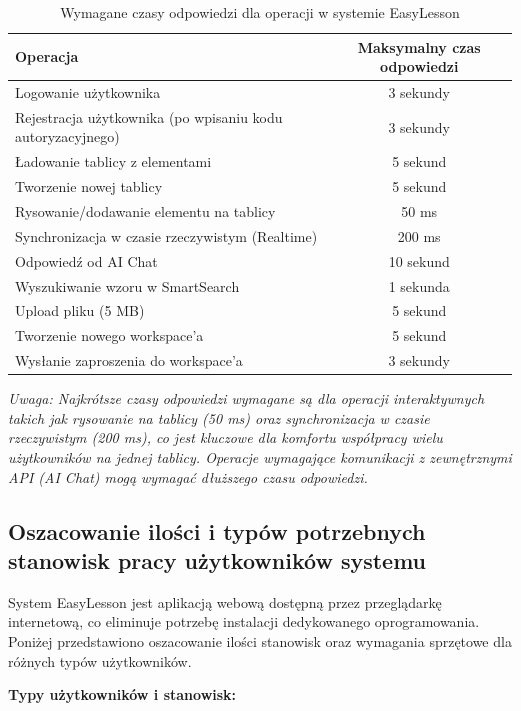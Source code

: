 \documentclass[12pt,a4paper]{article}
\begin{document}
\begin{table}[H]
\centering
\begin{tabular}{|l|c|}
\hline
\textbf{Operacja} & \textbf{Maksymalny czas odpowiedzi} \\ \hline
Logowanie użytkownika & 3 sekundy \\ \hline
Rejestracja użytkownika (po wpisaniu kodu autoryzacyjnego) & 3 sekundy \\ \hline
Ładowanie tablicy z elementami & 5 sekund \\ \hline
Tworzenie nowej tablicy & 5 sekund \\ \hline
Rysowanie/dodawanie elementu na tablicy & 50 ms \\ \hline
Synchronizacja w czasie rzeczywistym (Realtime) & 200 ms \\ \hline
Odpowiedź od AI Chat & 10 sekund \\ \hline
Wyszukiwanie wzoru w SmartSearch & 1 sekunda \\ \hline
Upload pliku (5 MB) & 5 sekund \\ \hline
Tworzenie nowego workspace'a & 5 sekund \\ \hline
Wysłanie zaproszenia do workspace'a & 3 sekundy \\ \hline
\end{tabular}
\caption{Wymagane czasy odpowiedzi dla operacji w systemie EasyLesson}
\label{tab:czasy_odpowiedzi}
\end{table}

\vspace{1em}
\textit{Uwaga: Najkrótsze czasy odpowiedzi wymagane są dla operacji interaktywnych takich jak rysowanie na tablicy (50 ms) oraz synchronizacja w czasie rzeczywistym (200 ms), co jest kluczowe dla komfortu współpracy wielu użytkowników na jednej tablicy. Operacje wymagające komunikacji z zewnętrznymi API (AI Chat) mogą wymagać dłuższego czasu odpowiedzi.}

\subsection{Oszacowanie ilości i typów potrzebnych stanowisk pracy użytkowników systemu}

System EasyLesson jest aplikacją webową dostępną przez przeglądarkę internetową, co eliminuje potrzebę instalacji dedykowanego oprogramowania. Poniżej przedstawiono oszacowanie ilości stanowisk oraz wymagania sprzętowe dla różnych typów użytkowników.

\textbf{Typy użytkowników i stanowisk:}
\end{document}

